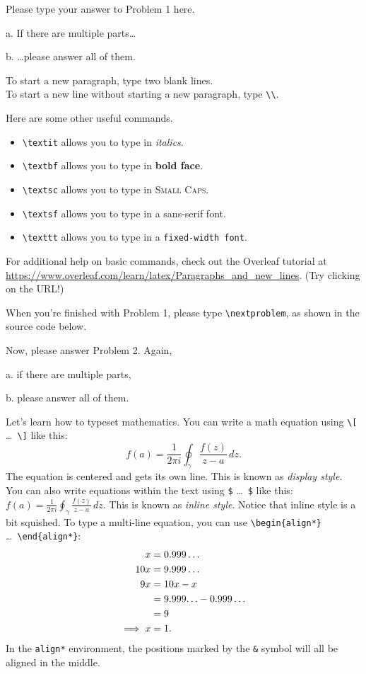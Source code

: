 \documentclass{cpsc202}
\begin{document}
    
    Please type your answer to Problem 1 here.
    
    a. If there are multiple parts\dots
    
    b. \dots please answer all of them.
    
    To start a new paragraph, type two blank lines.\\To start a new line without starting a new paragraph, type \verb!\\!.
    
    Here are some other useful commands.
    \begin{itemize}
        \item \verb!\textit! allows you to type in \textit{italics}.
        \item \verb!\textbf! allows you to type in \textbf{bold face}.
        \item \verb!\textsc! allows you to type in \textsc{Small Caps}.
        \item \verb!\textsf! allows you to type in a \textsf{sans-serif font}.
        \item \verb!\texttt! allows you to type in a \texttt{fixed-width font}.
    \end{itemize}
    For additional help on basic commands, check out the Overleaf tutorial at \url{https://www.overleaf.com/learn/latex/Paragraphs_and_new_lines}. (Try clicking on the URL!)
    
    When you're finished with Problem 1, please type \verb!\nextproblem!, as shown in the source code below.
    
    \nextproblem 
    
    Now, please answer Problem 2. Again,
    
    a. if there are multiple parts,
    
    b. please answer all of them.
    
    Let's learn how to typeset mathematics. You can write a math equation using \verb!\[! \dots\ \verb!\]! like this:
    \[
        f(a) = \frac{1}{2\pi i} \oint_\gamma \frac{f(z)}{z - a} \, dz.
    \]
    The equation is centered and gets its own line. This is known as \textit{display style}. You can also write equations within the text using \verb!$! \dots\ \verb!$! like this: $f(a) = \frac{1}{2\pi i} \oint_\gamma \frac{f(z)}{z - a} \, dz$. This is known as \textit{inline style}. Notice that inline style is a bit squished. To type a multi-line equation, you can use \verb!\begin{align*}! \dots\ \verb!\end{align*}!:
    \begin{align*}
        x &= 0.999\dots \\
        10x &= 9.999\dots \\
        9x &= 10x - x \\
        &= 9.999\mathalpha{\dots} - 0.999\dots \\
        &= 9 \\
        \implies x &= 1.
    \end{align*}
    In the \verb!align*! environment, the positions marked by the \verb!&! symbol will all be aligned in the middle.
    
\end{document}

